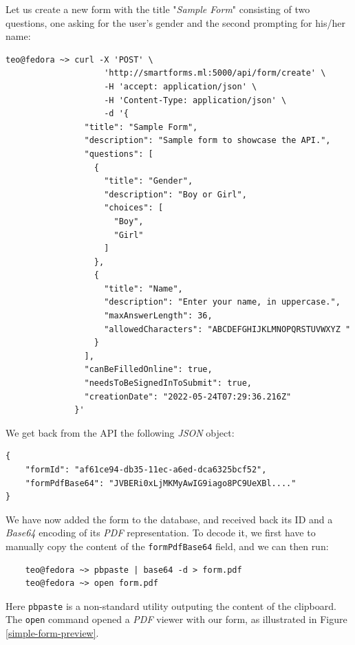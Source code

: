 \documentclass[11pt, a4paper]{report}
\def\code#1{\texttt{#1}}
\begin{document}
Let us create a new form with the title "\textit{Sample Form}" consisting of two questions, one asking for the user's gender and the second prompting for his/her name:

\begin{verbatim}
teo@fedora ~> curl -X 'POST' \
                    'http://smartforms.ml:5000/api/form/create' \
                    -H 'accept: application/json' \
                    -H 'Content-Type: application/json' \
                    -d '{
                "title": "Sample Form",
                "description": "Sample form to showcase the API.",
                "questions": [
                  {
                    "title": "Gender",
                    "description": "Boy or Girl",
                    "choices": [
                      "Boy",
                      "Girl"
                    ]
                  },
                  {
                    "title": "Name",
                    "description": "Enter your name, in uppercase.",
                    "maxAnswerLength": 36,
                    "allowedCharacters": "ABCDEFGHIJKLMNOPQRSTUVWXYZ "
                  }
                ],
                "canBeFilledOnline": true,
                "needsToBeSignedInToSubmit": true,
                "creationDate": "2022-05-24T07:29:36.216Z"
              }'
\end{verbatim}

We get back from the API the following \textit{JSON} object:
\begin{verbatim}
{
    "formId": "af61ce94-db35-11ec-a6ed-dca6325bcf52",
    "formPdfBase64": "JVBERi0xLjMKMyAwIG9iago8PC9UeXBl...."
}
\end{verbatim}

We have now added the form to the database, and received back its ID and a \textit{Base64} encoding of its \textit{PDF} representation. To decode it, we first have to manually copy the content of the \code{formPdfBase64} field, and we can then run:

\begin{verbatim}
    teo@fedora ~> pbpaste | base64 -d > form.pdf
    teo@fedora ~> open form.pdf
\end{verbatim}

Here \code{pbpaste} is a non-standard utility outputing the content of the clipboard. The \code{open} command opened a \textit{PDF} viewer with our form, as illustrated in Figure \ref{simple-form-preview}.
\end{document}
